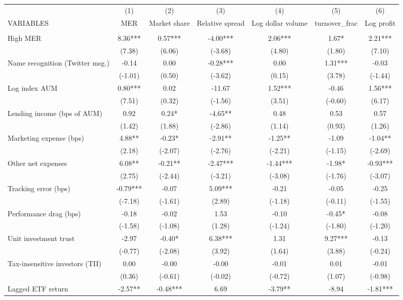 \documentclass[]{article}
\begin{document}
\begin{tabular}{lcccccc} \hline
 & (1) & (2) & (3) & (4) & (5) & (6) \\
VARIABLES & MER & Market share & Relative spread & Log dollar volume & turnover\_frac & Log profit \\ \hline
 &  &  &  &  &  &  \\
High MER & 8.36*** & 0.57*** & -4.00*** & 2.06*** & 1.67* & 2.21*** \\
 & (7.38) & (6.06) & (-3.68) & (4.80) & (1.80) & (7.10) \\
Name recognition (Twitter msg.) & -0.14 & 0.00 & -0.28*** & 0.00 & 1.31*** & -0.03 \\
 & (-1.01) & (0.50) & (-3.62) & (0.15) & (3.78) & (-1.44) \\
Log index AUM & 0.80*** & 0.02 & -11.67 & 1.52*** & -0.46 & 1.56*** \\
 & (7.51) & (0.32) & (-1.56) & (3.51) & (-0.60) & (6.17) \\
Lending income (bps of AUM) & 0.92 & 0.24* & -4.65** & 0.48 & 0.53 & 0.57 \\
 & (1.42) & (1.88) & (-2.86) & (1.14) & (0.93) & (1.26) \\
Marketing expense (bps) & 4.88** & -0.23* & -2.91** & -1.25** & -1.09 & -1.04** \\
 & (2.18) & (-2.07) & (-2.76) & (-2.21) & (-1.15) & (-2.69) \\
Other net expenses & 6.08** & -0.21** & -2.47*** & -1.44*** & -1.98* & -0.93*** \\
 & (2.75) & (-2.44) & (-3.21) & (-3.08) & (-1.76) & (-3.07) \\
Tracking error (bps) & -0.79*** & -0.07 & 5.09*** & -0.21 & -0.05 & -0.25 \\
 & (-7.18) & (-1.61) & (2.89) & (-1.18) & (-0.11) & (-1.55) \\
Performance drag (bps) & -0.18 & -0.02 & 1.53 & -0.10 & -0.45* & -0.08 \\
 & (-1.58) & (-1.08) & (1.28) & (-1.24) & (-1.80) & (-1.20) \\
Unit investment trust & -2.97 & -0.40* & 6.38*** & 1.31 & 9.27*** & -0.13 \\
 & (-0.77) & (-2.08) & (3.92) & (1.64) & (3.88) & (-0.24) \\
Tax-insensitive investors (TII) & 0.00 & -0.00 & -0.00 & -0.01 & 0.01 & -0.01 \\
 & (0.36) & (-0.61) & (-0.02) & (-0.72) & (1.07) & (-0.98) \\
Lagged ETF return & -2.57** & -0.48*** & 6.69 & -3.79** & -8.94 & -1.81*** \\

\end{tabular}
\end{document}
